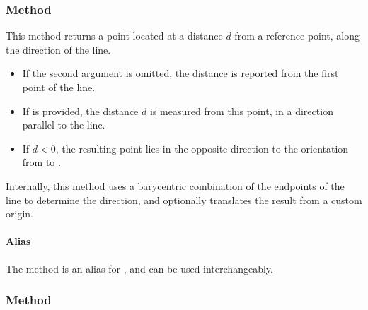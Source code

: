 \subsubsection{Method } %
\label{ssub:method_report}

This method returns a point located at a distance $d$ from a reference point, along the direction of the line.

\begin{itemize}
  \item If the second argument  is omitted, the distance is reported from the first point  of the line.
  \item If  is provided, the distance $d$ is measured from this point, in a direction parallel to the line.
  \item If $d < 0$, the resulting point lies in the opposite direction to the orientation from  to .
\end{itemize}

Internally, this method uses a barycentric combination of the endpoints of the line to determine the direction, and optionally translates the result from a custom origin.

\vspace{1em}
\paragraph{Alias} The method  is an alias for , and can be used interchangeably.

\vspace{1em}
\begin{tkzexample}[latex=.5\textwidth]
\begin{center}
\end{center}
\end{tkzexample}

\subsubsection{Method } %
\label{ssub:barycenter_with_a_line}

